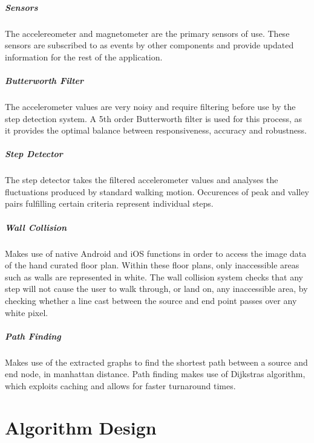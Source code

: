 \documentclass[12pt,a4paper]{report}
\begin{document}
\paragraph{Sensors}
The accelereometer and magnetometer are the primary sensors of use. These sensors are subscribed to as events by other components and provide updated information for the rest of the application.

\paragraph{Butterworth Filter}
The accelerometer values are very noisy and require filtering before use by the step detection system. A 5th order Butterworth filter is used for this process, as it provides the optimal balance between responsiveness, accuracy and robustness.

\paragraph{Step Detector}
The step detector takes the filtered accelerometer values and analyses the fluctuations produced by standard walking motion. Occurences of peak and valley pairs fulfilling certain criteria represent individual steps.

\paragraph{Wall Collision}
Makes use of native Android and iOS functions in order to access the image data of the hand curated floor plan. Within these floor plans, only inaccessible areas such as walls are represented in white. The wall collision system checks that any step will not cause the user to walk through, or land on, any inaccessible area, by checking whether a line cast between the source and end point passes over any white pixel.

\paragraph{Path Finding}
Makes use of the extracted graphs to find the shortest path between a source and end node, in manhattan distance. Path finding makes use of Dijkstras algorithm, which exploits caching and allows for faster turnaround times.

\chapter{Algorithm Design}
\end{document}
